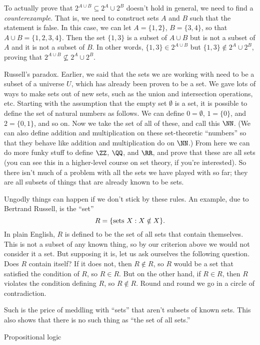 To actually prove that $2^{A\cup B} \subseteq 2^A \cup 2^B$ doesn't hold in general, we need to find
a {\it counterexample}. That is, we need to construct sets $A$ and $B$ such that the statement is false.
In this case, we can let $A = \{1,2\}$, $B = \{3,4\}$, so that $A\cup B = \{1,2,3,4\}$.
Then the set $\{1,3\}$ is a subset of $A\cup B$ but is not a subset of $A$ and it is not a subset of $B$.
In other words, $\{1,3\}\in 2^{A\cup B}$ but $\{1,3\} \notin 2^A\cup 2^B$, proving that
$2^{A\cup B} \not\subseteq 2^A \cup 2^B$.

\medskip\boldlabel{} Russell's paradox. Earlier, we said that the sets we are working with
need to be a subset of a universe $U$, which has already been proven to be a set. We gave lots of
ways to make sets out of new sets, such as the union and intersection operations, etc. Starting with
the assumption that the empty set $\emptyset$ is a set,
it is possible to define the set of natural numbers as follows.
We can define $0 = \emptyset$, $1 = \{0\}$, and $2 = \{0,1\}$, and so on.
Now we take the set of all of these, and call this $\NN$.
(We can also define addition and multiplication on these set-theoretic ``numbers''
so that they behave like addition and multiplication do on $\NN$.) From here we can do more funky stuff
to define $\ZZ$, $\QQ$, and $\RR$, and prove that these are all sets (you can see this in a higher-level
course on set theory, if you're interested). So there isn't much of a problem
with all the sets we have played with so far; they are all subsets of things that are already known to be sets.

Ungodly things can happen if we don't stick by these rules. An example, due to Bertrand Russell, is the ``set''
$$R = \{\hbox{sets}\ X : X \notin X \}.$$
In plain English, $R$ is defined to be the set of all sets that contain themselves.
This is not a subset of any known thing, so by our criterion above we would not consider it a set.
But supposing it is, let us ask ourselves the following question. Does $R$ contain itself?
If it does not, then $R\notin R$, so $R$ would be a set that satisfied the condition of $R$, so $R\in R$.
But on the other hand, if $R\in R$, then $R$ violates the condition defining $R$, so $R\notin R$.
Round and round we go in a circle of contradiction.

Such is the price of meddling with ``sets'' that aren't subsets of known sets. This also shows that there
is no such thing as ``the set of all sets.''

\advsect Propositional logic

